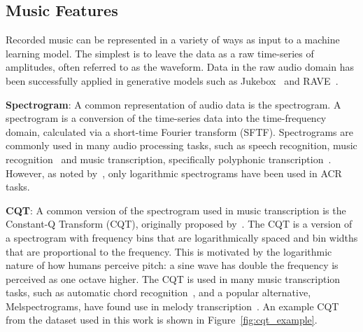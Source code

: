 



\subsection{Music Features}\label{sec:background-features}

Recorded music can be represented in a variety of ways as input to a machine learning model. The simplest is to leave the data as a raw time-series of amplitudes, often referred to as the waveform. Data in the raw audio domain has been successfully applied in generative models such as Jukebox~\citep{Jukebox} and RAVE~\citep{RAVE}.

\textbf{Spectrogram}: A common representation of audio data is the spectrogram. A spectrogram is a conversion of the time-series data into the time-frequency domain, calculated via a short-time Fourier transform (SFTF). Spectrograms are commonly used in many audio processing tasks, such as speech recognition, music recognition~\citep{ShazamSpectrogram} and music transcription, specifically polyphonic transcription~\citep{PianoTranscriptionWithTransformer}. However, as noted by~\citet{20YearsofACR}, only logarithmic spectrograms have been used in ACR tasks.

\textbf{CQT}: A common version of the spectrogram used in music transcription is the Constant-Q Transform (CQT), originally proposed by~\citet{CQT}. The CQT is a version of a spectrogram with frequency bins that are logarithmically spaced and bin widths that are proportional to the frequency. This is motivated by the logarithmic nature of how humans perceive pitch: a sine wave has double the frequency is perceived as one octave higher. The CQT is used in many music transcription tasks, such as automatic chord recognition~\citep{FirstDeepLearningCQT}, and a popular alternative, Melspectrograms, have found use in melody transcription~\citep{PianoTranscriptionWithTransformer}. An example CQT from the dataset used in this work is shown in Figure~\ref{fig:cqt_example}.

